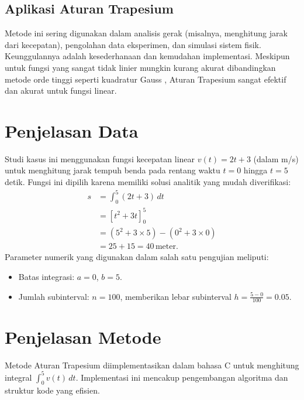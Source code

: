 \documentclass[conference]{IEEEtran}
\begin{document}
\subsection{Aplikasi Aturan Trapesium}
Metode ini sering digunakan dalam analisis gerak (misalnya, menghitung jarak dari kecepatan), pengolahan data eksperimen, dan simulasi sistem fisik. Keunggulannya adalah kesederhanaan dan kemudahan implementasi. Meskipun untuk fungsi yang sangat tidak linier mungkin kurang akurat dibandingkan metode orde tinggi seperti kuadratur Gauss \cite{b1}, Aturan Trapesium sangat efektif dan akurat untuk fungsi linear.

\section{Penjelasan Data}
Studi kasus ini menggunakan fungsi kecepatan linear \( v(t) = 2t + 3 \) (dalam m/s) untuk menghitung jarak tempuh benda pada rentang waktu \( t = 0 \) hingga \( t = 5 \) detik. Fungsi ini dipilih karena memiliki solusi analitik yang mudah diverifikasi:
\begin{align}
s &= \int_0^5 (2t + 3) \, dt \nonumber \\
  &= \left[ t^2 + 3t \right]_0^5 \nonumber \\
  &= (5^2 + 3 \times 5) - (0^2 + 3 \times 0) \nonumber \\
  &= 25 + 15 = 40 \, \text{meter}.
\label{eq:analytic}
\end{align}
Parameter numerik yang digunakan dalam salah satu pengujian meliputi:
\begin{itemize}
    \item Batas integrasi: \( a = 0 \), \( b = 5 \).
    \item Jumlah subinterval: \( n = 100 \), memberikan lebar subinterval \( h = \frac{5-0}{100} = 0.05 \).
\end{itemize}

\section{Penjelasan Metode}
Metode Aturan Trapesium diimplementasikan dalam bahasa C untuk menghitung integral \( \int_0^5 v(t) \, dt \). Implementasi ini mencakup pengembangan algoritma dan struktur kode yang efisien.
\end{document}
